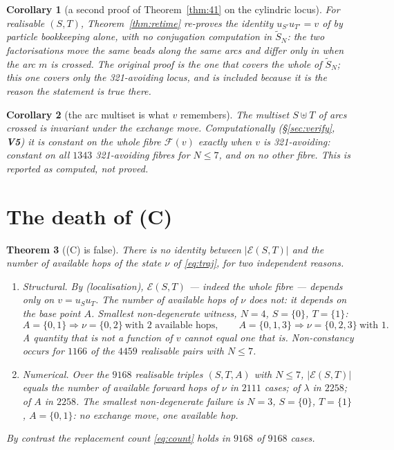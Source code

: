 \documentclass[11pt]{article}
\theoremstyle{plain}
\newtheorem{thm}{Theorem}[section]
\newtheorem{cor}[thm]{Corollary}
\theoremstyle{definition}
\newcommand{\Saff}{\widetilde{S}_{N}}
\begin{document}
\begin{cor}[a second proof of Theorem~\ref{thm:41} on the cylindric locus]\label{cor:second}
For realisable $(S,T)$, Theorem~\ref{thm:retime} re-proves the identity $u_{S'}u_{T'}=v$ of
\cite[Lem.~4.3]{ClioExch} by particle bookkeeping alone, with no conjugation computation in
$\Saff$: the two factorisations move the same beads along the same arcs and differ only in when
the arc $m$ is crossed. The original proof is the one that covers the whole of $\Saff$; this
one covers only the 321-avoiding locus, and is included because it is the reason the statement
is true there.
\end{cor}

\begin{cor}[the arc multiset is what $v$ remembers]\label{cor:multiset}
The multiset $S\uplus T$ of arcs crossed is invariant under the exchange move. Computationally
(\S\ref{sec:verify}, \textbf{V5}) it is constant on the whole fibre $\mathcal{F}(v)$ exactly
when $v$ is 321-avoiding: constant on all $1343$ 321-avoiding fibres for $N\le7$, and on no
other fibre. \emph{This is reported as computed, not proved.}
\end{cor}

\section{The death of (C)}\label{sec:kill}

\begin{thm}[(C) is false]\label{thm:kill}
There is no identity between $|\mathcal{E}(S,T)|$ and the number of available hops of the state
$\nu$ of \eqref{eq:traj}, for two independent reasons.
\begin{enumerate}
\item[\textbf{(K1)}] \emph{Structural.} By \cite[Thm.~3.1]{ClioExch} (localisation),
$\mathcal{E}(S,T)$ --- indeed the whole fibre --- depends only on $v=u_Su_T$. The number of
available hops of $\nu$ does not: it depends on the base point $A$. Smallest non-degenerate
witness, $N=4$, $S=\{0\}$, $T=\{1\}$:
\[
  A=\{0,1\}\Rightarrow\nu=\{0,2\}\ \text{with 2 available hops},\qquad
  A=\{0,1,3\}\Rightarrow\nu=\{0,2,3\}\ \text{with 1}.
\]
A quantity that is not a function of $v$ cannot equal one that is. Non-constancy occurs for
$1166$ of the $4459$ realisable pairs with $N\le7$.
\item[\textbf{(K2)}] \emph{Numerical.} Over the $9168$ realisable triples $(S,T,A)$ with
$N\le7$, $|\mathcal{E}(S,T)|$ equals the number of available forward hops of $\nu$ in $2111$
cases; of $\lambda$ in $2258$; of $A$ in $2258$. The smallest non-degenerate failure is $N=3$,
$S=\{0\}$, $T=\{1\}$, $A=\{0,1\}$: no exchange move, one available hop.
\end{enumerate}
By contrast the replacement count \eqref{eq:count} holds in $9168$ of $9168$ cases.
\end{thm}
\end{document}
